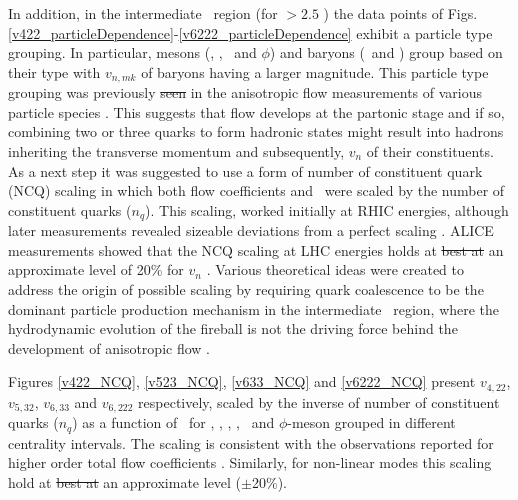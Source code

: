 \documentclass[ALICE,manyauthors]{cernphprep}
\providecommand{\DIFaddtex}[1]{{\protect\color{blue}\uwave{#1}}} %
\providecommand{\DIFdeltex}[1]{{\protect\color{red}\sout{#1}}}                      %
\providecommand{\DIFaddbegin}{} %
\providecommand{\DIFaddend}{} %
\providecommand{\DIFdelbegin}{} %
\providecommand{\DIFdelend}{} %
\providecommand{\DIFadd}[1]{\texorpdfstring{\DIFaddtex{#1}}{#1}} %
\providecommand{\DIFdel}[1]{\texorpdfstring{\DIFdeltex{#1}}{}} %
\begin{document}
\newpage

In addition, in the intermediate \pT~region (for \pT $> 2.5$ \GeV) the data points of Figs. \ref{v422_particleDependence}-\ref{v6222_particleDependence} exhibit a particle type grouping. In particular, mesons (\pion, \kaon, \Ks~and $\phi$) and baryons (\proton~and \lambdas) group based on their type with $v_{n,mk}$ of baryons having a larger magnitude. This particle type grouping was previously \DIFdelbegin \DIFdel{seen }\DIFdelend \DIFaddbegin \DIFadd{observed }\DIFaddend in the anisotropic flow measurements of various particle species \cite{Abelev:2014pua,Adam:2016nfo,Acharya:2018zuq,Adams:2003am,Abelev:2007qg,Adler:2003kt,Adare:2006ti}. This suggests that flow develops at the partonic stage and if so, combining two or three quarks to form hadronic states might result into hadrons inheriting the transverse momentum and subsequently, $v_{n}$ of their constituents. As a next step it was suggested to use a form of number of constituent quark (NCQ) scaling in which both flow coefficients and \pT~were scaled by the number of constituent quarks ($n_{q}$). This scaling, worked initially at RHIC energies, although later measurements revealed sizeable deviations from a perfect scaling \cite{Adams:2003am,Abelev:2007qg,Adler:2003kt,Adare:2006ti}. ALICE measurements showed that the NCQ scaling at LHC energies holds at \DIFdelbegin \DIFdel{best at }\DIFdelend an approximate level of 20\% for $v_{n}$ \cite{Abelev:2014pua,Adam:2016nfo,Acharya:2018zuq}. Various theoretical ideas were created to address the origin of possible scaling by requiring quark coalescence to be the dominant particle production mechanism in the intermediate \pT~region, where the hydrodynamic evolution of the fireball is not the driving force behind the development of anisotropic flow \cite{Voloshin:2002wa,Molnar:2003ff}.


Figures \ref{v422_NCQ}, \ref{v523_NCQ}, \ref{v633_NCQ} and \ref{v6222_NCQ} present $v_{4,22}$, $v_{5,32}$, $v_{6,33}$ and $v_{6,222}$ respectively, scaled by the inverse of number of constituent quarks ($n_{q}$) as a function of \pTnq~for \pion, \kaon, \Ks, \proton, \lambdas~and $\phi$-meson grouped in different centrality intervals. The scaling is consistent with the observations reported for higher order total flow coefficients \cite{Acharya:2018zuq}. Similarly, for non-linear \DIFaddbegin \DIFadd{flow }\DIFaddend modes this scaling hold at \DIFdelbegin \DIFdel{best at }\DIFdelend an approximate level ($\pm$20\%). 
\end{document}
